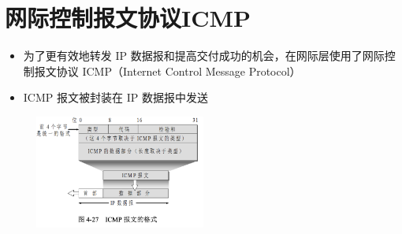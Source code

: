 \documentclass[cs4size,a4paper,10pt]{ctexart}
\begin{document}
	\section{网际控制报文协议ICMP}
	\begin{itemize}
		\item 为了更有效地转发 IP 数据报和提高交付成功的机会，在网际层使用了网际控制报文协议 ICMP（Internet Control Message Protocol）
		\item ICMP 报文被封装在 IP 数据报中发送
	\end{itemize}
	\begin{figure}[H]
		\centering
		\includegraphics[width=0.5\textwidth]{img/4.27}
	\end{figure}
\end{document}
